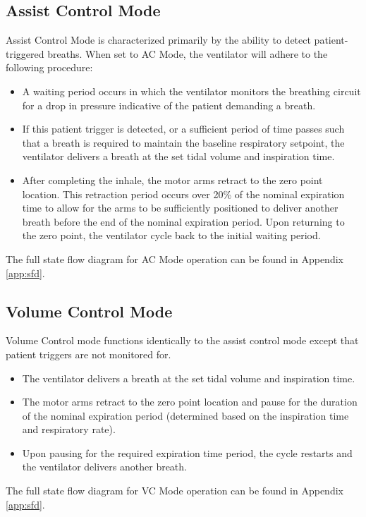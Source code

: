 \documentclass[]{article}
\begin{document}
\subsection{Assist Control Mode}
\label{sect:acMode}
Assist Control Mode is characterized primarily by the ability to detect patient-triggered breaths.  When set to AC Mode, the ventilator will adhere to the following procedure:
\begin{itemize}
	\item A waiting period occurs in which the ventilator monitors the breathing circuit for a drop in pressure indicative of the patient demanding a breath.
	\item If this patient trigger is detected, or a sufficient period of time passes such that a breath is required to maintain the baseline respiratory setpoint, the ventilator delivers a breath at the set tidal volume and inspiration time.
	\item After completing the inhale, the motor arms retract to the zero point location.  This retraction period occurs over 20\% of the nominal expiration time to allow for the arms to be sufficiently positioned to deliver another breath before the end of the nominal expiration period.  Upon returning to the zero point, the ventilator cycle back to the initial waiting period. 
\end{itemize}
The full state flow diagram for AC Mode operation can be found in Appendix \ref{app:sfd}.


\subsection{Volume Control Mode}
\label{sect:vcMode}
Volume Control mode functions identically to the assist control mode except that patient triggers are not monitored for.
\begin{itemize}
	\item The ventilator delivers a breath at the set tidal volume and inspiration time.
	\item The motor arms retract to the zero point location and pause for the duration of the nominal expiration period (determined based on the inspiration time and respiratory rate).
	\item Upon pausing for the required expiration time period, the cycle restarts and the ventilator delivers another breath.
\end{itemize}
The full state flow diagram for VC Mode operation can be found in Appendix \ref{app:sfd}.
\end{document}
